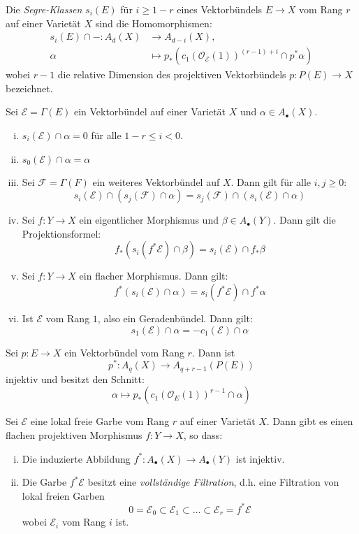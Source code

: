 \documentclass[10pt,a4paper]{article}
\begin{document}
\begin{definition}
Die \textit{Segre-Klassen} $s_i(E)$ für $i\geq 1-r$ eines Vektorbündels $E\to X$ vom Rang $r$ auf einer Varietät $X$ sind die Homomorphismen:
\begin{align*}
s_i(E)\cap -: A_d(X)&\to A_{d-i}(X),\\ 
\alpha&\mapsto p_\ast(c_1(\mathcal{O}_\mathcal{E}(1))^{(r-1)+i} \cap p^\ast\alpha)
\end{align*}
wobei $r-1$ die relative Dimension des projektiven Vektorbündels $p: P(E)\to X$ bezeichnet.
\end{definition}

\begin{proposition}
Sei $\mathcal{E} = \Gamma(E)$ ein Vektorbündel auf einer Varietät $X$ und $\alpha\in A_\bullet(X)$.
\begin{enumerate}[(i)]
\item $s_i(\mathcal{E})\cap\alpha = 0$ für alle $1-r\leq i <0$.
\item $s_0(\mathcal{E})\cap\alpha = \alpha$
\item Sei $\mathcal{F} = \Gamma(F)$ ein weiteres Vektorbündel auf $X$. Dann gilt für alle $i,j\geq 0$:
\[ s_i(\mathcal{E})\cap (s_j(\mathcal{F}) \cap \alpha) = s_j(\mathcal{F}) \cap (s_i(\mathcal{E})\cap \alpha) \]
\item Sei $f:Y\to X$ ein eigentlicher Morphismus und $\beta\in A_\bullet(Y)$. Dann gilt die Projektionsformel:
\[ f_\ast(s_i(f^\ast\mathcal{E})\cap\beta) = s_i(\mathcal{E})\cap f_\ast\beta \]
\item Sei $f:Y\to X$ ein flacher Morphismus. Dann gilt:
\[ f^\ast(s_i(\mathcal{E})\cap \alpha) = s_i(f^\ast\mathcal{E})\cap f^\ast\alpha \]
\item Ist $\mathcal{E}$ vom Rang $1$, also ein Geradenbündel. Dann gilt:
\[ s_1(\mathcal{E}) \cap\alpha = -c_1(\mathcal{E})\cap \alpha \]
\end{enumerate}
\end{proposition}

\begin{corollary}
Sei $p:E\to X$ ein Vektorbündel vom Rang $r$. Dann ist
\[ p^\ast: A_q(X)\to A_{q+r-1}(P(E)) \]
injektiv und besitzt den Schnitt:
\[ \alpha\mapsto p_\ast(c_1(\mathcal{O}_E(1))^{r-1}\cap\alpha) \]
\end{corollary}

\begin{corollary}
Sei $\mathcal{E}$ eine lokal freie Garbe vom Rang $r$ auf einer Varietät $X$. Dann gibt es einen flachen projektiven Morphismus $f:Y\to X$, so dass:
\begin{enumerate}[(i)]
\item Die induzierte Abbildung $f^\ast:A_\bullet(X)\to A_\bullet(Y)$ ist injektiv.
\item Die Garbe $f^\ast\mathcal{E}$ besitzt eine \textit{vollständige Filtration}, d.h. eine Filtration von lokal freien Garben
\[ 0 = \mathcal{E}_0 \subset \mathcal{E}_1 \subset\ldots\subset \mathcal{E}_r = f^\ast\mathcal{E} \]
wobei $\mathcal{E}_i$ vom Rang $i$ ist.
\end{enumerate}
\end{corollary}
\end{document}
